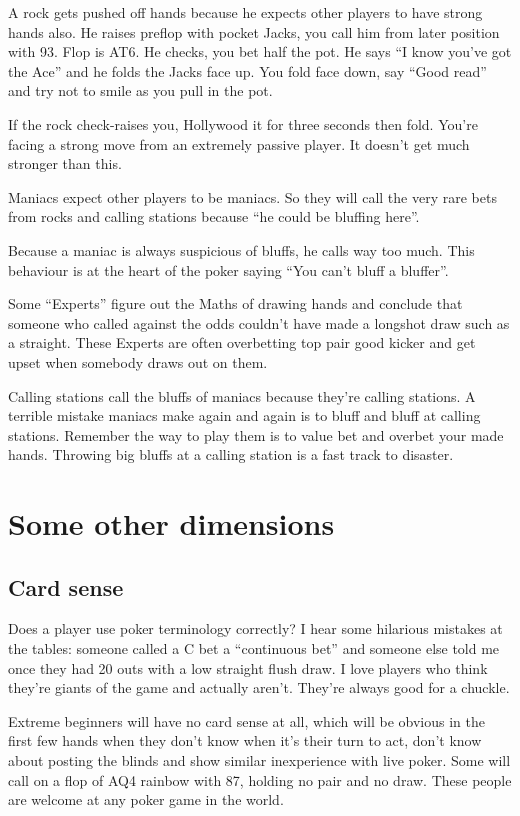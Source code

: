 A rock gets pushed off hands because he expects other players to
have strong hands also. He raises preflop with pocket Jacks,
you call him from later position with 93. Flop is AT6. He checks, you
bet half the pot. He says ``I know you've got the Ace'' and he
folds the Jacks face up. You fold face down, say ``Good read''
and try not to smile as you pull in the pot.

If the rock check-raises you, Hollywood it for three seconds then fold.
You're facing a strong move from an extremely passive player. It
doesn't get much stronger than this.

Maniacs expect other players to be maniacs. So they will call the
very rare bets from rocks and calling stations because ``he could
be bluffing here''.

Because a maniac is always suspicious of bluffs, he calls way too much.
This behaviour is at the heart of the poker saying ``You can't bluff
a bluffer''.

Some ``Experts'' figure out the Maths of drawing hands and conclude
that someone who called against the odds couldn't have made a longshot
draw such as a straight. These Experts are often overbetting top pair
good kicker and get upset when somebody draws out on them.

Calling stations call the bluffs of maniacs because they're calling
stations. A terrible mistake maniacs
make again and again is to bluff and bluff at calling
stations. Remember the way to play them is to value bet and overbet
your made hands. Throwing big bluffs at a calling station is a
fast track to disaster.

\section{Some other dimensions}

\subsection{Card sense}

Does a player use poker terminology correctly? I hear some hilarious
mistakes at the tables: someone called a C bet a ``continuous bet''
and someone else told me once they had 20 outs with a low straight
flush draw. I love players who think they're giants of the game
and actually aren't. They're always good for a chuckle.

Extreme beginners will have no card sense at all, which will be
obvious in the first few hands when they don't know when it's
their turn to act, don't know about posting the blinds and show
similar inexperience with live poker. Some will call on a flop
of AQ4 rainbow with 87, holding no pair and no draw. These people
are welcome at any poker game in the world.

